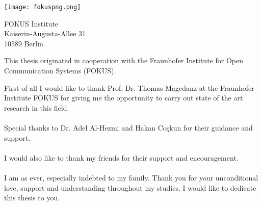 \thispagestyle{empty}
\vspace*{3cm}


\begin{center}
\texttt{[image: fokuspng.png]}
\end{center}

\vspace*{0.2cm}

\begin{center}
FOKUS Institute\\
Kaiserin-Augusta-Allee 31\\
10589 Berlin\\
\end{center}
\vspace*{0.5cm}

\noindent This thesis originated in cooperation with the Fraunhofer Institute for Open Communication Systems (FOKUS).

\vspace*{1cm}
\noindent 
First of all I would like to thank Prof. Dr. Thomas Magedanz at the Fraunhofer Institute FOKUS for giving me the opportunity to carry out state of the art research in this field. 
\\
\\
Special thanks to Dr. Adel Al-Hezmi and Hakan Co\c{s}kun for their guidance and support.
\\
\\
I would also like to thank my friends for their support and encouragement.
\\
\\
I am as ever, especially indebted to my family. Thank you for your unconditional love, support and understanding throughout my studies. I would like to dedicate this thesis to you.
